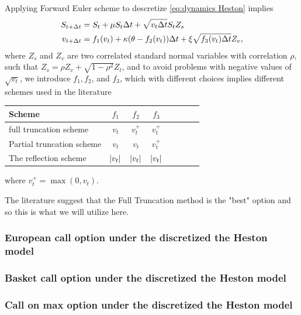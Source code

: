 Applying Forward Euler scheme to descretize \ref{eq:dynamics Heston} implies 
\begin{align}\label{eq:FE_Heston_discrete}
S_{t+\Delta t}&= S_t +\mu S_t \Delta t+\sqrt{v_t \Delta t}S_t Z_s \nonumber\\
v_{t+\Delta t}&=f_1(v_t)+\kappa (\theta-f_2(v_t)) \Delta t+\xi \sqrt{f_3(v_t) \Delta t} Z_v,
\end{align}
where $Z_s$ and $Z_v$  are two correlated standard normal variables with correlation $\rho$, such that $Z_s=\rho Z_v+\sqrt{1-\rho^2} Z_t$, and to avoid problems with negative values of $\sqrt{v_t}$, we introduce $f_1, f_2$, and $f_3$, which with different choices implies different schemes used in the literature 

\FloatBarrier
\begin{table}[h!]
	\centering
	\begin{tabular}{l*{6}{c}r}
		\toprule[1.5pt]
	Scheme &  $f_1$& $f_2$  & $f_3$     \\
	\hline
	full truncation scheme & $v_t$ &  $v_t^+$&$v_t^+$\\
	Partial truncation scheme & $v_t$ &  $v_t$&$v_t^+$\\
	The reflection scheme  &$\left\lvert v_t\right\rvert$ & $\left\lvert v_t\right\rvert$& $\left\lvert v_t\right\rvert$\\
			\bottomrule[1.25pt]
	\end{tabular}
	\label{Numerical schemes for CIR process}
\end{table}
\FloatBarrier
where  $v_t^+=\max(0,v_t)$.

The literature suggest that the Full Truncation method is the "best" option and so this is what we will utilize here. 

\subsubsection{European call option  under the discretized the Heston model }
\subsubsection{Basket call option under the discretized the Heston model }

\subsubsection{Call on max option under the discretized the Heston model }

